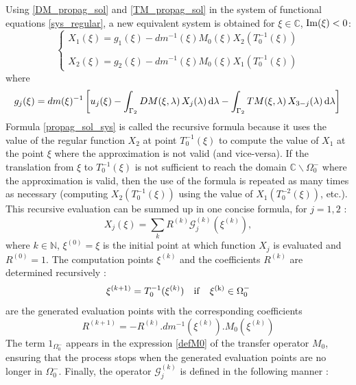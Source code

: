 Using \eqref{DM_propag_sol} and \eqref{TM_propag_sol} in the system of functional equations \eqref{sys_regular}, a new equivalent system is obtained for $\xi \in \mathbb{C}$, ${\rm Im}(\xi) <0$:
\begin{equation}
\label{propag_sol_sys}
\begin{cases}
X_1(\xi) = g_1(\xi) -  dm^{-1}(\xi)M_0(\xi)X_2(T_0^{-1}(\xi)) \\
\\
X_2(\xi) = g_2(\xi) - dm^{-1}(\xi)M_0(\xi)X_1(T_0^{-1}(\xi))
\end{cases}
\end{equation}
where
\begin{equation}
g_j(\xi) = dm(\xi)^{-1} \left[ u_j(\xi) - \int_{\Gamma_2} DM(\xi,\lambda) \, X_j(\lambda) \, {\rm d} \lambda - \int_{\Gamma_2} TM(\xi,\lambda) \, X_{3-j}(\lambda) \, {\rm d} \lambda \right] \\
\end{equation}
Formula \eqref{propag_sol_sys} is called the recursive formula because it uses the value of the regular function $X_2$ at point $T_0^{-1}(\xi)$ to compute the value of $X_1$ at the point $\xi$ where the approximation is not valid (and vice-versa). If the translation from $\xi$ to $T_0^{-1}(\xi)$ is not sufficient to reach the domain $\mathbb{C} \backslash \Omega_0^-$ where the approximation is valid, then the use of the formula is repeated as many times as necessary (computing $X_2(T_0^{-1}(\xi))$ using the value of $X_1(T_0^{-2}(\xi))$, etc.). This recursive evaluation can be summed up in one concise formula, for $j=1,2$ :
\begin{equation}
X_j(\xi)= \sum_{k} R^{(k)}\mathcal{G}_j^{(k)}(\xi^{(k)}),
\label{prop_concise_ac}
\end{equation}
where $k \in \mathbb{N}$, $\xi^{(0)}=\xi$ is the initial point at which function $X_j$ is evaluated and $R^{(0)}=1$. The computation points $\xi^{(k)}$ and the coefficients $R^{(k)}$ are determined recursively :
\begin{equation}
\xi^{(k+1)}=T_0^{-1}(\xi^{(k)}) \quad \rm if \quad \xi^{(k)} \in \Omega_0^-
\end{equation}
are the generated evaluation points with the corresponding coefficients 
\begin{equation}
R^{(k+1)}=-R^{(k)}.dm^{-1}(\xi^{(k)}).M_0(\xi^{(k)})
\end{equation}
The term $1_{\Omega_0^-}$ appears in the expression \eqref{defM0} of the transfer operator $M_0$, ensuring that the process stops when the generated evaluation points are no longer in $\Omega_0^-$. Finally, the operator $\mathcal{G}_j^{(k)}$ is defined in the following manner :
